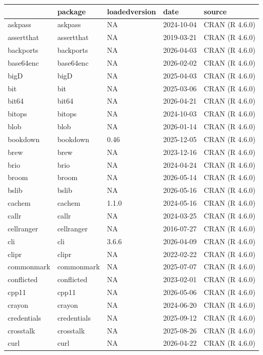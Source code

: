 \documentclass[
]{book}
\begin{document}
\begin{tabular}{lllll}
\toprule
  & package & loadedversion & date & source\\
\midrule
askpass & askpass & NA & 2024-10-04 & CRAN (R 4.6.0)\\
assertthat & assertthat & NA & 2019-03-21 & CRAN (R 4.6.0)\\
backports & backports & NA & 2026-04-03 & CRAN (R 4.6.0)\\
base64enc & base64enc & NA & 2026-02-02 & CRAN (R 4.6.0)\\
bigD & bigD & NA & 2025-04-03 & CRAN (R 4.6.0)\\
\addlinespace
bit & bit & NA & 2025-03-06 & CRAN (R 4.6.0)\\
bit64 & bit64 & NA & 2026-04-21 & CRAN (R 4.6.0)\\
bitops & bitops & NA & 2024-10-03 & CRAN (R 4.6.0)\\
blob & blob & NA & 2026-01-14 & CRAN (R 4.6.0)\\
bookdown & bookdown & 0.46 & 2025-12-05 & CRAN (R 4.6.0)\\
\addlinespace
brew & brew & NA & 2023-12-16 & CRAN (R 4.6.0)\\
brio & brio & NA & 2024-04-24 & CRAN (R 4.6.0)\\
broom & broom & NA & 2026-05-14 & CRAN (R 4.6.0)\\
bslib & bslib & NA & 2026-05-16 & CRAN (R 4.6.0)\\
cachem & cachem & 1.1.0 & 2024-05-16 & CRAN (R 4.6.0)\\
\addlinespace
callr & callr & NA & 2024-03-25 & CRAN (R 4.6.0)\\
cellranger & cellranger & NA & 2016-07-27 & CRAN (R 4.6.0)\\
cli & cli & 3.6.6 & 2026-04-09 & CRAN (R 4.6.0)\\
clipr & clipr & NA & 2022-02-22 & CRAN (R 4.6.0)\\
commonmark & commonmark & NA & 2025-07-07 & CRAN (R 4.6.0)\\
\addlinespace
conflicted & conflicted & NA & 2023-02-01 & CRAN (R 4.6.0)\\
cpp11 & cpp11 & NA & 2026-05-06 & CRAN (R 4.6.0)\\
crayon & crayon & NA & 2024-06-20 & CRAN (R 4.6.0)\\
credentials & credentials & NA & 2025-09-12 & CRAN (R 4.6.0)\\
crosstalk & crosstalk & NA & 2025-08-26 & CRAN (R 4.6.0)\\
\addlinespace
curl & curl & NA & 2026-04-22 & CRAN (R 4.6.0)\\

\end{tabular}
\end{document}
